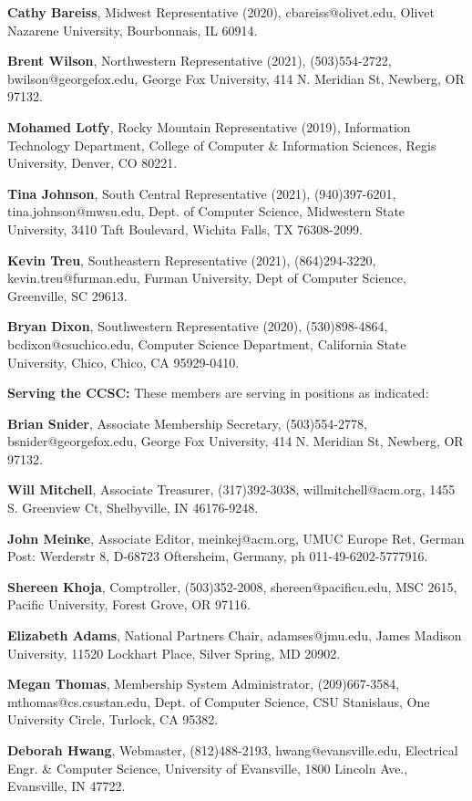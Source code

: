 \documentclass{article}
\begin{document}
\begin{multicols}{2}
\begin{raggedright}
\noindent
\textbf{Cathy Bareiss}, Midwest Representative (2020), cbareiss@olivet.edu,
Olivet Nazarene University, Bourbonnais, IL 60914.

\noindent
\textbf{Brent Wilson}, Northwestern Representative (2021), (503)554-2722,
bwilson@georgefox.edu, George Fox University, 414 N. Meridian St, Newberg,
OR 97132.

\noindent
\textbf{Mohamed Lotfy}, Rocky Mountain Representative (2019), Information
Technology Department, College of Computer \& Information Sciences, Regis
University, Denver, CO 80221.

\noindent
\textbf{Tina Johnson}, South Central Representative (2021), (940)397-6201,
tina.johnson@mwsu.edu, Dept. of Computer Science, Midwestern State University,
3410 Taft Boulevard, Wichita Falls, TX 76308-2099.

\noindent
\textbf{Kevin Treu}, Southeastern Representative (2021), (864)294-3220,
kevin.treu@furman.edu, Furman University, Dept of Computer Science, Greenville,
SC 29613.

\noindent
\textbf{Bryan Dixon}, Southwestern Representative (2020), (530)898-4864,
bcdixon@csuchico.edu, Computer Science Department, California State University,
Chico, Chico, CA 95929-0410.

\vspace{0.2in}
\noindent
\textbf{Serving the CCSC:} These members are serving in positions as indicated:

\noindent
\textbf{Brian Snider}, Associate Membership Secretary, (503)554-2778,
bsnider@georgefox.edu, George Fox University, 414 N. Meridian St, Newberg,
OR 97132.

\noindent
\textbf{Will Mitchell}, Associate Treasurer, (317)392-3038,
willmitchell@acm.org, 1455 S. Greenview Ct, Shelbyville, IN 46176-9248.

\noindent
\textbf{John Meinke}, Associate Editor, meinkej@acm.org, UMUC Europe Ret,
German Post: Werderstr 8, D-68723 Oftersheim, Germany, ph 011-49-6202-5777916.

\noindent
\textbf{Shereen Khoja}, Comptroller, (503)352-2008, shereen@pacificu.edu,
MSC 2615, Pacific University, Forest Grove, OR 97116.

\noindent
\textbf{Elizabeth Adams}, National Partners Chair, adamses@jmu.edu,
James Madison University, 11520 Lockhart Place, Silver Spring, MD 20902.

\noindent
\textbf{Megan Thomas}, Membership System Administrator, (209)667-3584,
mthomas@cs.csustan.edu, Dept. of Computer Science, CSU Stanislaus,
One University Circle, Turlock, CA 95382.

\noindent
\textbf{Deborah Hwang}, Webmaster, (812)488-2193, hwang@evansville.edu,
Electrical Engr. \& Computer Science, University of Evansville,
1800 Lincoln Ave., Evansville, IN 47722.

\end{raggedright}
\end{multicols}
\end{document}
